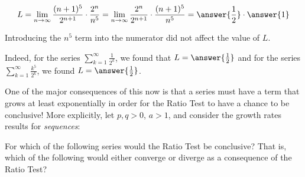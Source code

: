 \documentclass{ximera}
\begin{document}
\begin{exercise}
\begin{exercise}
\begin{exercise}
\[
L =  \lim_{n \to \infty} \frac{(n+1)^5}{2^{n+1}} \cdot \frac{2^n}{n^5} =  \lim_{n \to \infty} \frac{2^n}{2^{n+1}} \cdot \frac{(n+1)^5}{n^5} =  \answer{\frac{1}{2}} \cdot \answer{1}
\]

Introducing the $n^5$ term into the numerator did not affect the value of $L$.

Indeed, for the series $\sum_{k=1}^{\infty} \frac{1}{2^k}$, we found that $L=\answer{\frac{1}{2}}$ and for the series $\sum_{k=1}^{\infty} \frac{k^5}{2^k}$, we found $L=\answer{\frac{1}{2}}$. 

\begin{exercise}
One of the major consequences of this now is that a series must have a term that grows at least exponentially in order for the Ratio Test to have a chance to be conclusive!  More explicitly, let $p, q > 0$, $a>1$, and consider the growth rates results for \emph{sequences}:

\begin{image}
  \end{image}

For which of the following series would the Ratio Test be conclusive?  That is, which of the following would either converge or diverge as a consequence of the Ratio Test?
\begin{selectAll}
\end{selectAll}

\end{exercise}
\end{exercise}
\end{exercise}
\end{exercise}
\end{document}
